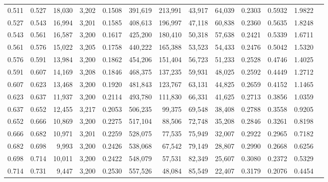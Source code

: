 \begin{tabular}{rrrrrrrrrrrrr}
0.511 & 0.527 & 18,030 & 3,202 &                                     0.1508 & 391,619 & 213,991 &  43,917 &  64,039 & 0.2303 & 0.5932 & 1.9822 \\
0.527 & 0.543 & 16,994 & 3,201 &                                     0.1585 & 408,613 & 196,997 &  47,118 &  60,838 & 0.2360 & 0.5635 & 1.8248 \\
0.543 & 0.561 & 16,587 & 3,200 &                                     0.1617 & 425,200 & 180,410 &  50,318 &  57,638 & 0.2421 & 0.5339 & 1.6711 \\
0.561 & 0.576 & 15,022 & 3,205 &                                     0.1758 & 440,222 & 165,388 &  53,523 &  54,433 & 0.2476 & 0.5042 & 1.5320 \\
0.576 & 0.591 & 13,984 & 3,200 &                                     0.1862 & 454,206 & 151,404 &  56,723 &  51,233 & 0.2528 & 0.4746 & 1.4025 \\
0.591 & 0.607 & 14,169 & 3,208 &                                     0.1846 & 468,375 & 137,235 &  59,931 &  48,025 & 0.2592 & 0.4449 & 1.2712 \\
0.607 & 0.623 & 13,468 & 3,200 &                                     0.1920 & 481,843 & 123,767 &  63,131 &  44,825 & 0.2659 & 0.4152 & 1.1465 \\
0.623 & 0.637 & 11,937 & 3,200 &                                     0.2114 & 493,780 & 111,830 &  66,331 &  41,625 & 0.2713 & 0.3856 & 1.0359 \\
0.637 & 0.652 & 12,455 & 3,217 &                                     0.2053 & 506,235 &  99,375 &  69,548 &  38,408 & 0.2788 & 0.3558 & 0.9205 \\
0.652 & 0.666 & 10,869 & 3,200 &                                     0.2275 & 517,104 &  88,506 &  72,748 &  35,208 & 0.2846 & 0.3261 & 0.8198 \\
0.666 & 0.682 & 10,971 & 3,201 &                                     0.2259 & 528,075 &  77,535 &  75,949 &  32,007 & 0.2922 & 0.2965 & 0.7182 \\
0.682 & 0.698 &  9,993 & 3,200 &                                     0.2426 & 538,068 &  67,542 &  79,149 &  28,807 & 0.2990 & 0.2668 & 0.6256 \\
0.698 & 0.714 & 10,011 & 3,200 &                                     0.2422 & 548,079 &  57,531 &  82,349 &  25,607 & 0.3080 & 0.2372 & 0.5329 \\
0.714 & 0.731 &  9,447 & 3,200 &                                     0.2530 & 557,526 &  48,084 &  85,549 &  22,407 & 0.3179 & 0.2076 & 0.4454 \\

\end{tabular}
